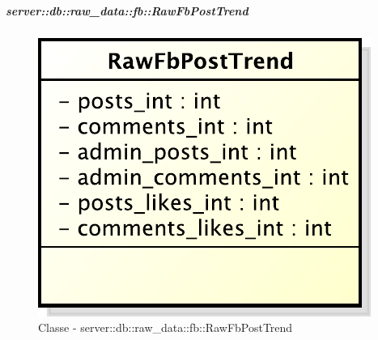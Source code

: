 

			\subparagraph{server::db::raw\_data::fb::RawFbPostTrend} %
			\label{subp:server_db_raw_data_fb_RawFbPostTrend}
				\begin{figure}[htbp]
					\centering
					\centerline{\includegraphics[scale=0.75]{./images/server/classes/db/raw_fb_post_trend.pdf}}
					\caption{Classe - server::db::raw\_data::fb::RawFbPostTrend}
				\end{figure}
